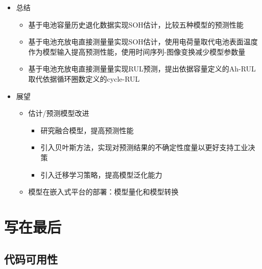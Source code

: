 \documentclass{beamer}
\newcommand{\pdfnote}[1]{\marginnote{\pdfcomment[icon=note]{#1}}}
\begin{document}
\begin{frame}
	\begin{itemize}
		\item 总结
		      \begin{itemize}
			      \item 基于电池容量历史退化数据实现SOH估计，比较五种模型的预测性能
			      \item 基于电池充放电直接测量量实现SOH估计，使用电荷量取代电池表面温度作为模型输入提高预测性能，使用时间序列-图像变换减少模型参数量
			      \item 基于电池充放电直接测量量实现RUL预测，提出依据容量定义的Ah-RUL取代依据循环圈数定义的cycle-RUL
		      \end{itemize}
		\item 展望
		      \begin{itemize}
			      \item 估计/预测模型改进
			            \begin{itemize}
				            \item 研究融合模型，提高预测性能
				            \item 引入贝叶斯方法，实现对预测结果的不确定性度量以更好支持工业决策
				            \item 引入迁移学习策略，提高模型泛化能力
			            \end{itemize}
			      \item 模型在嵌入式平台的部署：模型量化和模型转换
		      \end{itemize}
	\end{itemize}
\end{frame}

\section{写在最后}

\subsection{代码可用性}
\end{document}
